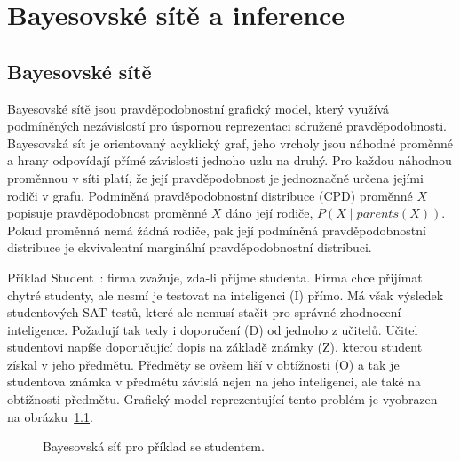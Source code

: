 \chapter{Bayesovské sítě a inference}

\section{Bayesovské sítě}

Bayesovské sítě jsou pravděpodobnostní grafický model, který využívá podmíněných nezávislostí pro úspornou reprezentaci sdružené pravděpodobnosti.
Bayesovská sít je orientovaný acyklický graf, jeho vrcholy jsou náhodné proměnné a hrany odpovídají přímé závislosti jednoho uzlu na druhý.
Pro každou náhodnou proměnnou v síti platí, že její pravděpodobnost je jednoznačně určena jejími rodiči v grafu.
Podmíněná pravděpodobnostní distribuce (CPD) proměnné $X$ popisuje pravděpodobnost proměnné $X$ dáno její rodiče, $P(X \mid parents(X))$.
Pokud proměnná nemá žádná rodiče, pak její podmíněná pravděpodobnostní distribuce je ekvivalentní marginální pravděpodobnostní distribuci.

Příklad Student~\cite{koller2009probabilistic}: firma zvažuje, zda-li přijme studenta.
Firma chce přijímat chytré studenty, ale nesmí je testovat na inteligenci (I) přímo.
Má však výsledek studentových SAT testů, které ale nemusí stačit pro správné zhodnocení inteligence.
Požadují tak tedy i doporučení (D) od jednoho z učitelů.
Učitel studentovi napíše doporučující dopis na základě známky (Z), kterou student získal v jeho předmětu.
Předměty se ovšem liší v obtížnosti (O) a tak je studentova známka v předmětu závislá nejen na jeho inteligenci, ale také na obtížnosti předmětu.
Grafický model reprezentující tento problém je vyobrazen na obrázku~\ref{fig:student}.
\begin{figure}
\begin{center}
\end{center}
\label{fig:student}
\caption{Bayesovská síť pro příklad se studentem.}
\end{figure}

